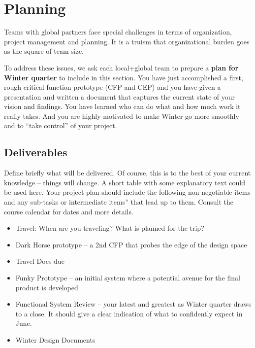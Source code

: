 \chapter{Planning}
\label{project-planning}

\begin{remark}\color{blue}
Teams with global partners face special challenges in  terms of organization, project management and planning.
It is a truism that organizational burden goes as the square of team size. 

To address these issues, we ask each local+global team to prepare a \textbf{plan for Winter quarter} to include in this section. You have just accomplished a first, rough critical function prototype (CFP and CEP) and you have given a presentation and written a document that captures the current state of your vision and findings. You have learned who can do what and how much work it really takes. And you are highly motivated to make Winter go more smoothly and to ``take control'' of your project.
\normalcolor \end{remark}

\section{Deliverables}
Define briefly what will be delivered. Of course, this is to the best of your current knowledge -- things will change. A short table with some explanatory text could be used here. Your project plan should include the following non-negotiable items and any sub-tasks or intermediate items'' that lead up to them. Consult the course calendar for dates and more details.

\begin{itemize} \tightlist
\item Travel: When are you traveling? What is planned for the trip?
\item Dark Horse prototype -- a 2nd CFP that probes the edge of the design space
\item Travel Docs due
\item Funky Prototype -- an initial system where a potential avenue for the final product is developed
\item Functional System Review -- your latest and greatest as Winter quarter draws to a close. It should give a clear indication of what to confidently expect in June.
\item Winter Design Documents
\end{itemize}

